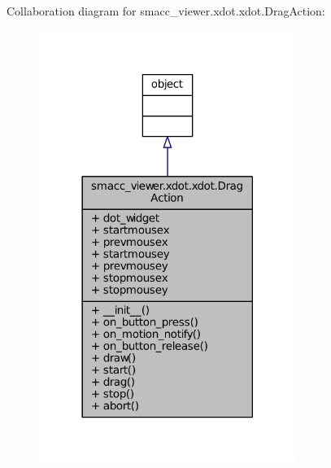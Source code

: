 Collaboration diagram for smacc\+\_\+viewer.\+xdot.\+xdot.\+Drag\+Action\+:
\nopagebreak
\begin{figure}[H]
\begin{center}
\leavevmode
\includegraphics[width=237pt]{classsmacc__viewer_1_1xdot_1_1xdot_1_1DragAction__coll__graph}
\end{center}
\end{figure}
